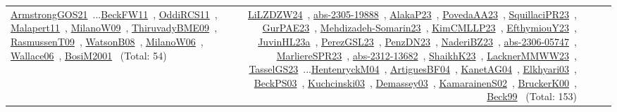 {\begin{longtable}{p{3cm}r>{\raggedright\arraybackslash}p{6cm}>{\raggedright\arraybackslash}p{6cm}>{\raggedright\arraybackslash}p{8cm}}
\href{../works/ArmstrongGOS21.pdf}{ArmstrongGOS21}~\cite{ArmstrongGOS21}...\href{../works/BeckFW11.pdf}{BeckFW11}~\cite{BeckFW11}, \href{../works/OddiRCS11.pdf}{OddiRCS11}~\cite{OddiRCS11}, \href{../works/Malapert11.pdf}{Malapert11}~\cite{Malapert11}, \href{../works/MilanoW09.pdf}{MilanoW09}~\cite{MilanoW09}, \href{../works/ThiruvadyBME09.pdf}{ThiruvadyBME09}~\cite{ThiruvadyBME09}, \href{../works/RasmussenT09.pdf}{RasmussenT09}~\cite{RasmussenT09}, \href{../works/WatsonB08.pdf}{WatsonB08}~\cite{WatsonB08}, \href{../works/MilanoW06.pdf}{MilanoW06}~\cite{MilanoW06}, \href{../works/Wallace06.pdf}{Wallace06}~\cite{Wallace06}, \href{../works/BosiM2001.pdf}{BosiM2001}~\cite{BosiM2001} (Total: 54) & \href{../works/LiLZDZW24.pdf}{LiLZDZW24}~\cite{LiLZDZW24}, \href{../works/abs-2305-19888.pdf}{abs-2305-19888}~\cite{abs-2305-19888}, \href{../works/AlakaP23.pdf}{AlakaP23}~\cite{AlakaP23}, \href{../works/PovedaAA23.pdf}{PovedaAA23}~\cite{PovedaAA23}, \href{../works/SquillaciPR23.pdf}{SquillaciPR23}~\cite{SquillaciPR23}, \href{../works/GurPAE23.pdf}{GurPAE23}~\cite{GurPAE23}, \href{../works/Mehdizadeh-Somarin23.pdf}{Mehdizadeh-Somarin23}~\cite{Mehdizadeh-Somarin23}, \href{../works/KimCMLLP23.pdf}{KimCMLLP23}~\cite{KimCMLLP23}, \href{../works/EfthymiouY23.pdf}{EfthymiouY23}~\cite{EfthymiouY23}, \href{../works/JuvinHL23a.pdf}{JuvinHL23a}~\cite{JuvinHL23a}, \href{../works/PerezGSL23.pdf}{PerezGSL23}~\cite{PerezGSL23}, \href{../works/PenzDN23.pdf}{PenzDN23}~\cite{PenzDN23}, \href{../works/NaderiBZ23.pdf}{NaderiBZ23}~\cite{NaderiBZ23}, \href{../works/abs-2306-05747.pdf}{abs-2306-05747}~\cite{abs-2306-05747}, \href{../works/MarliereSPR23.pdf}{MarliereSPR23}~\cite{MarliereSPR23}, \href{../works/abs-2312-13682.pdf}{abs-2312-13682}~\cite{abs-2312-13682}, \href{../works/ShaikhK23.pdf}{ShaikhK23}~\cite{ShaikhK23}, \href{../works/LacknerMMWW23.pdf}{LacknerMMWW23}~\cite{LacknerMMWW23}, \href{../works/TasselGS23.pdf}{TasselGS23}~\cite{TasselGS23}...\href{../works/HentenryckM04.pdf}{HentenryckM04}~\cite{HentenryckM04}, \href{../works/ArtiguesBF04.pdf}{ArtiguesBF04}~\cite{ArtiguesBF04}, \href{../works/KanetAG04.pdf}{KanetAG04}~\cite{KanetAG04}, \href{../works/Elkhyari03.pdf}{Elkhyari03}~\cite{Elkhyari03}, \href{../works/BeckPS03.pdf}{BeckPS03}~\cite{BeckPS03}, \href{../works/Kuchcinski03.pdf}{Kuchcinski03}~\cite{Kuchcinski03}, \href{../works/Demassey03.pdf}{Demassey03}~\cite{Demassey03}, \href{../works/KamarainenS02.pdf}{KamarainenS02}~\cite{KamarainenS02}, \href{../works/BruckerK00.pdf}{BruckerK00}~\cite{BruckerK00}, \href{../works/Beck99.pdf}{Beck99}~\cite{Beck99} (Total: 153)\\

\end{longtable}}
